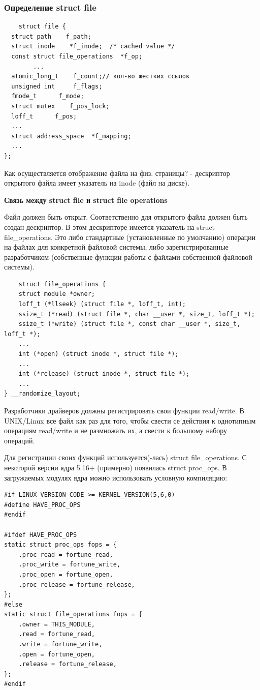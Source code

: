 \subsubsection{Определение struct file}
\begin{lstlisting}
    struct file {
  struct path    f_path;
  struct inode    *f_inode;  /* cached value */
  const struct file_operations  *f_op;
        ...
  atomic_long_t    f_count;// кол-во жестких ссылок
  unsigned int     f_flags;
  fmode_t      f_mode;
  struct mutex    f_pos_lock;
  loff_t      f_pos;
  ...
  struct address_space  *f_mapping;
  ...
};
\end{lstlisting}
Как осуществляется отображение файла на физ. страницы? - дескриптор открытого файла имеет указатель на inode (файл на диске).

\textbf{Связь между struct file и struct file operations}

Файл должен быть открыт. Соответственно для открытого файла должен быть создан дескриптор. В этом дескрипторе имеется указатель на struct file\_operations. Это либо стандартные (установленные по умолчанию) операции на файлах для конкретной файловой системы, либо зарегистрированные разработчиком (собственные функции работы с файлами собственной файловой системы).

\begin{lstlisting}
	struct file_operations {
	struct module *owner;
	loff_t (*llseek) (struct file *, loff_t, int);
	ssize_t (*read) (struct file *, char __user *, size_t, loff_t *);
	ssize_t (*write) (struct file *, const char __user *, size_t, loff_t *);
	...
	int (*open) (struct inode *, struct file *);
	...
	int (*release) (struct inode *, struct file *);
	...
} __randomize_layout;
\end{lstlisting}

Разработчики драйверов должны регистрировать свои функции read/write. В UNIX/Linux все файл как раз для того, чтобы свести се действия к однотипным операциям read/write и не размножать их, а свести к большому набору операций.

Для регистрации своих функций используется(-лась) struct file\_operations. С некоторой версии ядра 5.16+ (примерно) появилась struct proc\_ops. В загружаемых модулях ядра можно использовать условную компиляцию:

\begin{lstlisting}
#if LINUX_VERSION_CODE >= KERNEL_VERSION(5,6,0)
#define HAVE_PROC_OPS
#endif

#ifdef HAVE_PROC_OPS
static struct proc_ops fops = {
    .proc_read = fortune_read,
    .proc_write = fortune_write,
    .proc_open = fortune_open,
    .proc_release = fortune_release,
};
#else
static struct file_operations fops = {
    .owner = THIS_MODULE,
    .read = fortune_read,
    .write = fortune_write,
    .open = fortune_open,
    .release = fortune_release,
};
#endif
\end{lstlisting}

